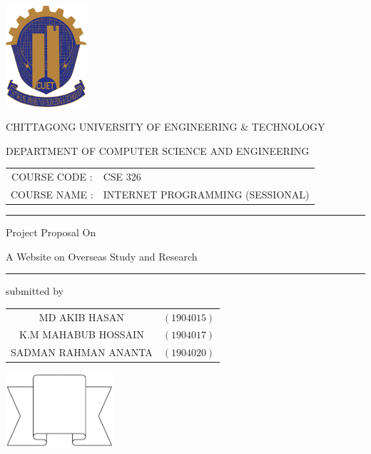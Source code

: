 \documentclass[a4paper,12pt]{report}
\begin{document}
\begin{titlepage}

	\centering

	\includegraphics[width=3cm, keepaspectratio]{cuet.png} \par \vspace{0.5cm}
	\begin{Large}
		CHITTAGONG UNIVERSITY OF ENGINEERING \& TECHNOLOGY
	\end{Large}
	\par
\vspace{.5cm}
{DEPARTMENT OF COMPUTER SCIENCE AND ENGINEERING}
\vspace{3cm}

\begin{tabular}{cl}
		COURSE CODE : & CSE 326              \\
COURSE NAME : & INTERNET PROGRAMMING (SESSIONAL)
	\end{tabular}
\vspace{0.5cm}

	\raisebox{-\baselineskip}{\rule{\textwidth}{1px}}
	\rule{\textwidth}{1px}

	{\Large{{Project Proposal On}}}\par \vspace{0.5cm}
\huge{{A Website on Overseas Study and Research}}
	\rule{\textwidth}{2px}

\vspace{1cm}
	\normalsize

	\parbox[l]{9cm}{
		\begin{center}
			submitted by
		\end{center}

		\begin{tabular}{cl}
			MD AKIB HASAN        & $(1904015)$ \\
			K.M MAHABUB HOSSAIN   & $(1904017)$ \\
			SADMAN RAHMAN ANANTA & $(1904020)$ \\
		\end{tabular}
	}
	\parbox[r]{7cm}{
		\vspace{1cm}
		\begin{center}
\includegraphics[width=4cm, keepaspectratio]{remarks.png}
		\end{center}
	}


\end{titlepage}
\end{document}
